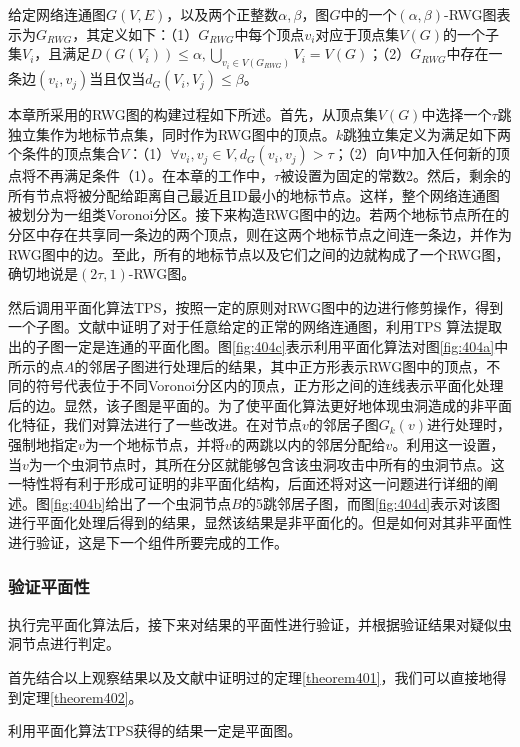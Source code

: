 \begin{definition}\label{def:402}
给定网络连通图$G(V,E)$，以及两个正整数$\alpha,\beta$，图$G$中的一个$(\alpha,\beta)$-RWG图表示为$G_{RWG}$，其定义如下：（1）$G_{RWG}$中每个顶点$v_i$对应于顶点集$V(G)$的一个子集$V_i$，且满足$D(G(V_i))\le\alpha, \bigcup_{v_i\in{V(G_{RWG})}}V_i=V(G)$；（2）$G_{RWG}$中存在一条边$(v_i,v_j)$当且仅当$d_G(V_i,V_j)\le\beta$。
\end{definition}

本章所采用的RWG图的构建过程如下所述。首先，从顶点集$V(G)$中选择一个$\tau$跳独立集作为地标节点集，同时作为RWG图中的顶点。$k$跳独立集定义为满足如下两个条件的顶点集合$V$：（1）$\forall{v_i,v_j}\in{V}, d_G(v_i,v_j)>\tau$；（2）向$V$中加入任何新的顶点将不再满足条件（1）。在本章的工作中，$\tau$被设置为固定的常数2。然后，剩余的所有节点将被分配给距离自己最近且ID最小的地标节点。这样，整个网络连通图被划分为一组类Voronoi分区。接下来构造RWG图中的边。若两个地标节点所在的分区中存在共享同一条边的两个顶点，则在这两个地标节点之间连一条边，并作为RWG图中的边。至此，所有的地标节点以及它们之间的边就构成了一个RWG图，确切地说是$(2\tau,1)$-RWG图。

然后调用平面化算法TPS，按照一定的原则对RWG图中的边进行修剪操作，得到一个子图。文献中证明了对于任意给定的正常的网络连通图，利用TPS 算法提取出的子图一定是连通的平面化图。图\ref{fig:404c}表示利用平面化算法对图\ref{fig:404a}中所示的点$A$的邻居子图进行处理后的结果，其中正方形表示RWG图中的顶点，不同的符号代表位于不同Voronoi分区内的顶点，正方形之间的连线表示平面化处理后的边。显然，该子图是平面的。为了使平面化算法更好地体现虫洞造成的非平面化特征，我们对算法进行了一些改进。在对节点$v$的邻居子图$G_k(v)$进行处理时，强制地指定$v$为一个地标节点，并将$v$的两跳以内的邻居分配给$v$。利用这一设置，当$v$为一个虫洞节点时，其所在分区就能够包含该虫洞攻击中所有的虫洞节点。这一特性将有利于形成可证明的非平面化结构，后面还将对这一问题进行详细的阐述。图\ref{fig:404b}给出了一个虫洞节点$B$的5跳邻居子图，而图\ref{fig:404d}表示对该图进行平面化处理后得到的结果，显然该结果是非平面化的。但是如何对其非平面性进行验证，这是下一个组件所要完成的工作。
\subsubsection{验证平面性}
执行完平面化算法后，接下来对结果的平面性进行验证，并根据验证结果对疑似虫洞节点进行判定。

首先结合以上观察结果以及文献中证明过的定理\ref{theorem401}，我们可以直接地得到定理\ref{theorem402}。
\begin{theorem}
  \label{theorem401}
利用平面化算法TPS获得的结果一定是平面图。
\end{theorem}


